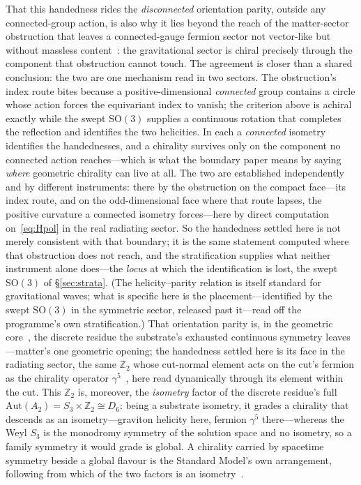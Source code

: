 \documentclass[11pt,a4paper]{article}
\theoremstyle{plain}
\theoremstyle{definition}
\theoremstyle{remark}
\begin{document}
That this handedness rides the \emph{disconnected} orientation parity, outside any connected-group action, is also why it lies beyond the reach of the matter-sector obstruction that leaves a connected-gauge fermion sector not vector-like but without massless content~\cite{JanzenBoundary}: the gravitational sector is chiral precisely through the component that obstruction cannot touch. The agreement is closer than a shared conclusion: the two are one mechanism read in two sectors. The obstruction's index route bites because a positive-dimensional \emph{connected} group contains a circle whose action forces the equivariant index to vanish; the criterion above is achiral exactly while the swept $\mathrm{SO}(3)$ supplies a continuous rotation that completes the reflection and identifies the two helicities. In each a \emph{connected} isometry identifies the handednesses, and a chirality survives only on the component no connected action reaches---which is what the boundary paper means by saying \emph{where} geometric chirality can live at all. The two are established independently and by different instruments: there by the obstruction on the compact face---its index route, and on the odd-dimensional face where that route lapses, the positive curvature a connected isometry forces---here by direct computation on~\eqref{eq:Hpol} in the real radiating sector. So the handedness settled here is not merely consistent with that boundary; it is the same statement computed where that obstruction does not reach, and the stratification supplies what neither instrument alone does---the \emph{locus} at which the identification is lost, the swept $\mathrm{SO}(3)$ of \S\ref{sec:strata}. (The helicity--parity relation is itself standard for gravitational waves; what is specific here is the placement---identified by the swept $\mathrm{SO}(3)$ in the symmetric sector, released past it---read off the programme's own stratification.) That orientation parity is, in the geometric core~\cite{JanzenGeometricCore}, the discrete residue the substrate's exhausted continuous symmetry leaves---matter's one geometric opening; the handedness settled here is its face in the radiating sector, the same $\mathbb{Z}_2$ whose cut-normal element acts on the cut's fermion as the chirality operator $\gamma^5$~\cite{JanzenBoundary}, here read dynamically through its element within the cut. This $\mathbb{Z}_2$ is, moreover, the \emph{isometry} factor of the discrete residue's full $\mathrm{Aut}(A_2)=S_3\times\mathbb{Z}_2\cong D_6$: being a substrate isometry, it grades a chirality that descends as an isometry---graviton helicity here, fermion $\gamma^5$ there---whereas the Weyl $S_3$ is the monodromy symmetry of the solution space and no isometry, so a family symmetry it would grade is global. A chirality carried by spacetime symmetry beside a global flavour is the Standard Model's own arrangement, following from which of the two factors is an isometry~\cite{JanzenAlgebroid,JanzenGeometricCore}.
\end{document}

